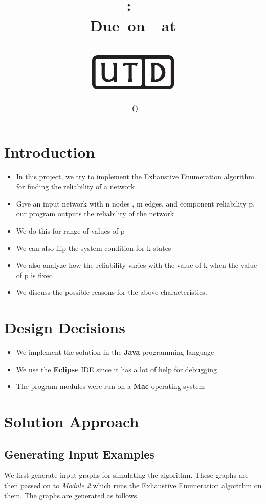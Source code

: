 \documentclass[12pt,letterpaper,titlepage,en-US]{article}
\title{
    \vspace{1in}
    \textmd{\textbf{\hmwkClassName \\\hmwkClass:\ \hmwkTitle }}\\
    \normalsize\vspace{0.1in}\small{Due\ on\ \DTMusedate{DueDate}\ at \DTMusetime{DueDate} }\\
    \vspace{0.1in}\large{\textit{\hmwkClassInstructor}}\\
    \vspace{0.5in}\includegraphics[height=2.4em]{UTD_logo_BW}\\
    \vspace{2in}
}
\author{\textbf{\hmwkAuthorName\ \footnotesize{(\hmwkAuthorNetID)}} \\ }
\date{}
\begin{document}
\maketitle
{}

\tableofcontents

\pagebreak
{}

\section{Introduction}
\begin{itemize}
\item In this project, we try to implement the Exhaustive Enumeration   algorithm for finding the reliability of a network
\item Give an input network with n nodes , m edges, and component reliability p, our program outputs the reliability of the network 
\item We do this for range of values of p
\item We can also flip the system condition for k states
\item  We also analyze how the reliability varies with the value of k when the value of p is fixed
\item We discuss the possible reasons for the above characteristics.
\end{itemize}

\section{Design Decisions}
\begin{itemize}
\item We implement the solution in the \textbf{Java} programming language
\item We use the \textbf{Eclipse} IDE since it has a lot of help for debugging 
\item The program modules were run on a \textbf{Mac} operating system

\end{itemize}





\section{Solution Approach}

\subsection{Generating Input Examples}
We first generate  input graphs for simulating the algorithm.
These graphs are then passed on to \textit{Module 2}  which runs the Exhaustive Enumeration algorithm on them. The graphs are generated as follows.
\end{document}
